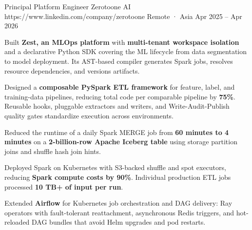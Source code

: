 \begin{cventries}

\cventry
  {Principal Platform Engineer}
  {Zerotoone AI}
  {https://www.linkedin.com/company/zerotoone}
  {Remote · Asia}
  {Apr 2025 -- Apr 2026}
  {\begin{cvitems}
    \item {Built \textbf{Zest, an MLOps platform} with \textbf{multi-tenant workspace isolation} and a declarative Python SDK covering the ML lifecycle from data segmentation to model deployment. Its AST-based compiler generates Spark jobs, resolves resource dependencies, and versions artifacts. }
    \item {Designed a \textbf{composable PySpark ETL framework} for feature, label, and training-data pipelines, reducing total code per comparable pipeline by \textbf{75\%}. Reusable hooks, pluggable extractors and writers, and Write-Audit-Publish quality gates standardize execution across environments. }
    \item {Reduced the runtime of a daily Spark MERGE job from \textbf{60 minutes to 4 minutes} on a \textbf{2-billion-row Apache Iceberg table} using storage partition joins and shuffle hash join hints. }
    \item {Deployed Spark on Kubernetes with S3-backed shuffle and spot executors, reducing \textbf{Spark compute costs by 90\%}. Individual production ETL jobs processed \textbf{10 TB+ of input per run}. }
    \item {Extended \textbf{Airflow} for Kubernetes job orchestration and DAG delivery: Ray operators with fault-tolerant reattachment, asynchronous Redis triggers, and hot-reloaded DAG bundles that avoid Helm upgrades and pod restarts. }
  \end{cvitems}}


\end{cventries}
